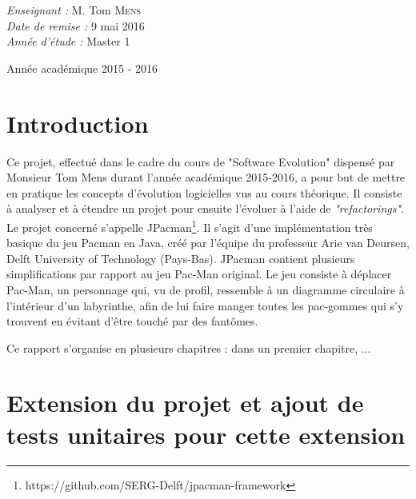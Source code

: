 \documentclass[12pt, openany]{report}
\begin{document}
\begin{titlepage}
\begin{sffamily}
\begin{center}
\begin{minipage}{0.4\textwidth}
\begin{flushleft}
      \end{flushleft}
    \end{minipage}
    \begin{minipage}{0.4\textwidth}
      \begin{flushright} \large
        \emph{Enseignant :} M. Tom  \textsc{Mens}\\
        \emph{Date de remise : } 9 mai 2016\\
        \emph{Année d'étude : } Master 1
      \end{flushright}
    \end{minipage}

    \vfill

    {\large Année académique 2015 - 2016}
	
  \end{center}
  \end{sffamily}
\end{titlepage}




\newpage


	\tableofcontents
	\newpage
	\setcounter{secnumdepth}{3}
	\setcounter{tocdepth}{4}
	

\chapter{Introduction}

Ce projet, effectué dans le cadre du cours de "Software Evolution" dispensé par Monsieur Tom Mens durant l'année académique 2015-2016, a pour but de mettre en pratique les concepts d'évolution logicielles vus au cours théorique. Il consiste à analyser et à étendre un projet pour ensuite l'évoluer à l'aide de \textit{"refactorings"}. Le projet concerné s'appelle JPacman\footnote{https://github.com/SERG-Delft/jpacman-framework}. Il s'agit d'une implémentation très basique du jeu Pacman en Java, créé par l'équipe  du professeur Arie van Deursen, Delft University of Technology (Pays-Bas).
 JPacman contient plusieurs simplifications par rapport au jeu Pac-Man original. Le jeu consiste à déplacer Pac-Man, un personnage qui, vu de profil, ressemble à un diagramme circulaire à l’intérieur d’un labyrinthe, afin de lui faire manger toutes les pac-gommes qui s’y trouvent en évitant d’être touché par des fantômes.
 
 Ce rapport s'organise en plusieurs chapitres : dans un premier chapitre, ...
 
\chapter{Extension du projet et ajout de tests unitaires pour cette extension }
\end{document}
